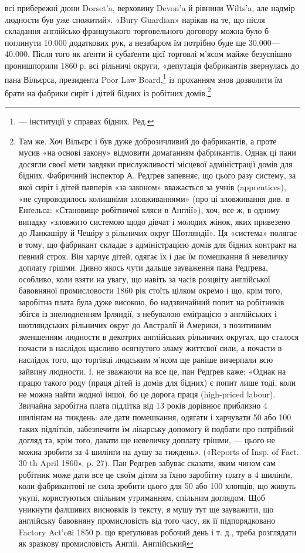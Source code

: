 всі прибережні дюни Dorset’a, верховину Devon’a
й рівнини Wilts’a, але надмір людности був уже спожитий».
«Bury Guardian» нарікав на те, що після складання англійсько-французького
торговельного договору можна було б поглинути
10.000 додаткових рук, а незабаром їм потрібно буде ще 30.000—40.000.
Після того як аґенти й субаґенти цієї торговлі м’ясом
майже безуспішно пронишпорили 1860 р. всі рільничі округи,
«депутація фабрикантів звернулась до пана Вільєрса, президента
Poor Law Board,\footnote*{
— інституції у справах бідних. Ред.
} із проханням знов дозволити їм брати на
фабрики сиріт і дітей бідних із робітних домів.\footnote{
Там же. Хоч Вільєрс і був дуже доброзичливий до фабрикантів,
а проте мусив «на основі закону» відмовити домаганням фабрикантів.
Однак ці пани досягли своєї мети завдяки прислужливості місцевої
адміністрації домів для бідних. Фабричний інспектор А. Редґрев запевняє,
що цього разу систему, за якої сиріт і дітей павперів «за законом» вважається
за учнів (apprentices), «не супроводилось колишніми зловживаннями»
(про ці зловживання див. в Енґельса: «Становище робітничої
кляси в Англії»), хоч, все ж, в одному випадку «зловжито системою щодо
дівчат і молодих жінок, яких привезено до Ланкашіру й Чешіру з рільничих
округ Шотляндії». Ця «система» полягає в тому, що фабрикант складає
з адміністрацією домів для бідних контракт на певний строк. Він харчує
дітей, одягає їх і дає їм помешкання й невеличку доплату грішми.
Дивно якось чути дальше зауваження пана Редґрева, особливо, коли взяти
на увагу, що навіть за часів розцвіту англійської бавовняної промисловости
1860 рік стоїть цілком окремо і що, крім того, заробітна плата була
дуже високою, бо надзвичайний попит на робітників збігся із знелюдненням
Ірляндії, з небувалою еміґрацією з англійських і шотляндських
рільничих округ до Австралії й Америки, з позитивним зменшенням людности
в декотрих англійських рільничих округах, що сталося почасти в
наслідок щасливо осягнутого зламу життєвої сили, а почасти в наслідок
того, що торгівці людським м’ясом ще раніше вичерпали всю зайвину
людности. І, не зважаючи на все це, пан Редґрев каже: «Однак на працю
такого роду (праця дітей із домів для бідних) є попит лише тоді, коли не
можна найти жодної іншої, бо це дорога праця (high-priced labour).
Звичайна заробітна плата підлітка від 13 років дорівнює приблизно 4 шилінґам
на тиждень: але дати помешкання, одягати і харчувати 50 або 100
таких підлітків, забезпечити їм лікарську допомогу й подбати про потрібний
догляд та, крім того, давати ще невеличку доплату грішми, — цього
не можна зробити за 4 шилінґи на душу за тиждень». («Reports of Insp.
of Fact. 30 th April 1860», p. 27). Пан Редґрев забуває сказати, яким
чином сам робітник може дати все це своїм дітям за їхню заробітну плату
в 4 шилінґи, коли фабрикантові не сила зробити цього для 50 або 100
хлопців, що живуть укупі, користуються спільним утриманням, спільним
доглядом. Щоб уникнути фалшивих висновків із тексту, я мушу тут ще
зауважити, що англійську бавовняну промисловість від того часу, як
її підпорядковано Factory Act’oвi 1850 р. що вреґулював робочий день
і т. д., треба розглядати як зразкову промисловість Англії. Англійський
}


